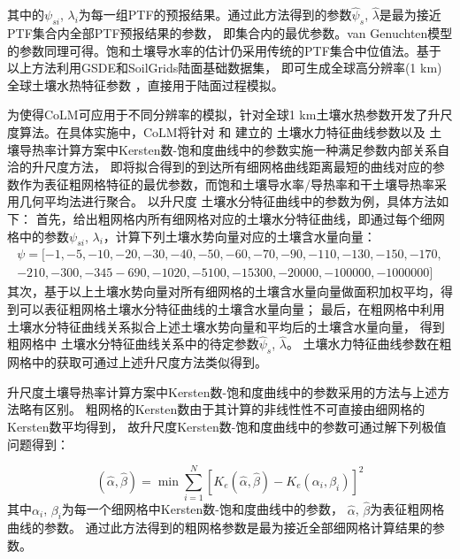 其中的$\psi_{s i}$, $\lambda_{i}$为每一组PTF的预报结果。通过此方法得到的参数$\hat{\psi}_{s}$, $\hat{\lambda}$是最为接近PTF集合内全部PTF预报结果的参数，
即集合内的最优参数。van Genuchten模型的参数同理可得。饱和土壤导水率的估计仍采用传统的PTF集合中位值法。基于以上方法利用GSDE和SoilGrids陆面基础数据集，
即可生成全球高分辨率(1 km)全球土壤水热特征参数 \citet{dai2019evaluation}，直接用于陆面过程模拟。



为使得CoLM可应用于不同分辨率的模拟，针对全球1 km土壤水热参数开发了升尺度算法。在具体实施中，CoLM将针对 \citet{campbell1974} 和 \citet{van1980closed} 建立的
土壤水力特征曲线参数以及 \citet{balland2005} 土壤导热率计算方案中Kersten数-饱和度曲线中的参数实施一种满足参数内部关系自洽的升尺度方法，
即将拟合得到的到达所有细网格曲线距离最短的曲线对应的参数作为表征粗网格特征的最优参数，而饱和土壤导水率/导热率和干土壤导热率采用几何平均法进行聚合。
以升尺度 \citet{campbell1974} 土壤水分特征曲线中的参数为例，具体方法如下：
首先，给出粗网格内所有细网格对应的土壤水分特征曲线，即通过每个细网格中的参数$\psi_{s i}$, $\lambda_{i}$，计算下列土壤水势向量对应的土壤含水量向量：
\begin{equation}
\begin{array}{l}\psi=[-1,-5,-10,-20,-30,-40,-50,-60,-70,-90,-110,-130,-150,-170,\\-210,-300,-345  -690,-1020,-5100,-15300,-20000,-100000,-1000000]\end{array}
\end{equation}
其次，基于以上土壤水势向量对所有细网格的土壤含水量向量做面积加权平均，得到可以表征粗网格土壤水分特征曲线的土壤含水量向量；
最后，在粗网格中利用\citet{campbell1974}土壤水分特征曲线关系拟合上述土壤水势向量和平均后的土壤含水量向量，
得到粗网格中 \citet{campbell1974} 土壤水分特征曲线关系中的待定参数$\hat{\psi}_{s}$, $\hat{\lambda}$。
\citet{van1980closed} 土壤水力特征曲线参数在粗网格中的获取可通过上述升尺度方法类似得到。


升尺度土壤导热率计算方案中Kersten数-饱和度曲线中的参数采用的方法与上述方法略有区别。
粗网格的Kersten数由于其计算的非线性性不可直接由细网格的Kersten数平均得到，
故升尺度Kersten数-饱和度曲线中的参数可通过解下列极值问题得到：

\begin{equation}
(\hat{\alpha}, \hat{\beta})=\min \sum_{i=1}^{N}\left[K_{e}(\hat{\alpha}, \hat{\beta})-K_{e}\left(\alpha_{i}, \beta_{i}\right)\right]^{2}
\end{equation}
其中$\alpha_{i}$,  $\beta_{i}$为每一个细网格中Kersten数-饱和度曲线中的参数，
$\hat{\alpha}$, $\hat{\beta}$为表征粗网格曲线的参数。
通过此方法得到的粗网格参数是最为接近全部细网格计算结果的参数。


